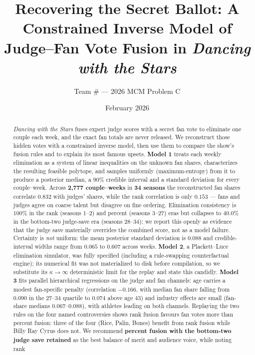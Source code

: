 \documentclass{article}
\title{\textbf{Recovering the Secret Ballot: A Constrained Inverse Model of\\ Judge--Fan Vote Fusion in \emph{Dancing with the Stars}}}
\author{Team \#{} --- 2026 MCM Problem C}
\date{February 2026}
\begin{document}
\maketitle

\begin{abstract}
\emph{Dancing with the Stars} fuses expert judge scores with a secret fan vote to eliminate
one couple each week, and the exact fan totals are never released. We reconstruct those
hidden votes with a constrained inverse model, then use them to compare the show's fusion
rules and to explain its most famous upsets. \textbf{Model 1} treats each weekly elimination
as a system of linear inequalities on the unknown fan shares, characterizes the resulting
feasible polytope, and samples uniformly (maximum-entropy) from it to produce a posterior
median, a $90\%$ credible interval and a standard deviation for every couple--week. Across
\textbf{2{,}777 couple--weeks} in \textbf{34 seasons} the reconstructed fan shares correlate
$\mathbf{0.832}$ with judges' shares, while the rank correlation is only $\mathbf{0.153}$ ---
fans and judges agree on coarse talent but disagree on fine ordering. Elimination consistency
is $100\%$ in the rank (seasons 1--2) and percent (seasons 3--27) eras but collapses to
$\mathbf{40.0\%}$ in the bottom-two judge-save era (seasons 28--34); we report this
openly as evidence that the judge save materially overrides the combined score, not as a
model failure. Certainty is \emph{not} uniform: the mean posterior standard deviation is
$0.088$ and credible-interval widths range from $0.065$ to $0.607$ across weeks.
\textbf{Model 2}, a Plackett--Luce elimination simulator, was fully specified (including a
rule-swapping counterfactual engine); its numerical fit was not materialized to disk before
compilation, so we substitute its $\kappa\to\infty$ deterministic limit for the replay and
state this candidly. \textbf{Model 3} fits parallel hierarchical regressions on the judge and
fan channels: age carries a modest fan-specific penalty (correlation $-0.166$, with median
fan share falling from $0.090$ in the 27--34 quartile to $0.074$ above age $43$) and industry
effects are small (fan-share medians $0.067$--$0.088$), with athletes leading on both
channels. Replaying the two rules on the four named controversies shows rank fusion favours
fan votes more than percent fusion: three of the four (Rice, Palin, Bones) benefit from rank
fusion while Billy Ray Cyrus does not. We recommend \textbf{percent fusion with the bottom-two
judge save retained} as the best balance of merit and audience voice, while noting rank

\end{abstract}
\end{document}
